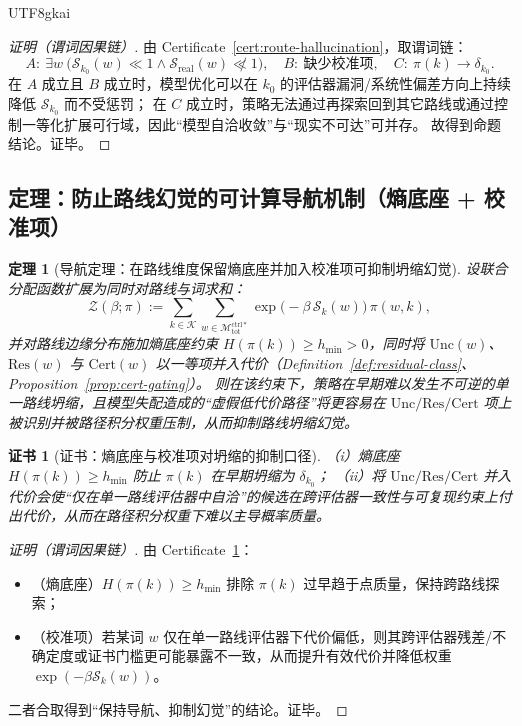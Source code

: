 \documentclass[12pt]{article}
\newtheorem{theorem}{定理}[section]
\newtheorem{certificate}{证书}[section]
\begin{document}
\begin{CJK*}{UTF8}{gkai}
\begin{proof}[证明（谓词因果链）]
由 Certificate~\ref{cert:route-hallucination}，取谓词链：
\[
A:\ \exists w\ \bigl(\mathcal{S}_{k_0}(w)\ll 1 \wedge \mathcal{S}_{\mathrm{real}}(w)\not\ll 1\bigr),\quad
B:\ \text{缺少校准项},\quad
C:\ \pi(k)\to\delta_{k_0}.
\]
在 $A$ 成立且 $B$ 成立时，模型优化可以在 $k_0$ 的评估器漏洞/系统性偏差方向上持续降低 $\mathcal{S}_{k_0}$ 而不受惩罚；
在 $C$ 成立时，策略无法通过再探索回到其它路线或通过控制一等化扩展可行域，因此“模型自洽收敛”与“现实不可达”可并存。
故得到命题结论。证毕。
\end{proof}

\subsection{定理：防止路线幻觉的可计算导航机制（熵底座 + 校准项）}

\begin{theorem}[导航定理：在路线维度保留熵底座并加入校准项可抑制坍缩幻觉]
\label{thm:navigation-against-hallucination}
设联合分配函数扩展为同时对路线与词求和：
\[
\mathcal{Z}(\beta;\pi)
:=
\sum_{k\in\mathcal{K}}
\sum_{w\in\mathcal{M}_{\mathrm{tot}}^{\mathrm{ctrl}\ast}}
\exp\!\bigl(-\beta\,\mathcal{S}_k(w)\bigr)\,\pi(w,k),
\]
并对路线边缘分布施加熵底座约束 $H(\pi(k))\ge h_{\min}>0$，同时将 $\mathrm{Unc}(w)$、$\mathrm{Res}(w)$ 与 $\mathrm{Cert}(w)$
  以一等项并入代价（Definition~\ref{def:residual-class}、Proposition~\ref{prop:cert-gating}）。
则在该约束下，策略在早期难以发生不可逆的单一路线坍缩，且模型失配造成的“虚假低代价路径”将更容易在 $\mathrm{Unc}/\mathrm{Res}/\mathrm{Cert}$ 项上被识别并被路径积分权重压制，从而抑制路线坍缩幻觉。
\end{theorem}

\begin{certificate}[证书：熵底座与校准项对坍缩的抑制口径]
\label{cert:entropy-calibration}
（i）熵底座 $H(\pi(k))\ge h_{\min}$ 防止 $\pi(k)$ 在早期坍缩为 $\delta_{k_0}$；
（ii）将 $\mathrm{Unc}/\mathrm{Res}/\mathrm{Cert}$ 并入代价会使“仅在单一路线评估器中自洽”的候选在跨评估器一致性与可复现约束上付出代价，从而在路径积分权重下难以主导概率质量。
\end{certificate}

\begin{proof}[证明（谓词因果链）]
由 Certificate~\ref{cert:entropy-calibration}：
\begin{itemize}
  \item（熵底座）$H(\pi(k))\ge h_{\min}$ 排除 $\pi(k)$ 过早趋于点质量，保持跨路线探索；
  \item（校准项）若某词 $w$ 仅在单一路线评估器下代价偏低，则其跨评估器残差/不确定度或证书门槛更可能暴露不一致，从而提升有效代价并降低权重 $\exp(-\beta\mathcal{S}_k(w))$。
\end{itemize}
二者合取得到“保持导航、抑制幻觉”的结论。证毕。
\end{proof}


\end{CJK*}
\end{document}
